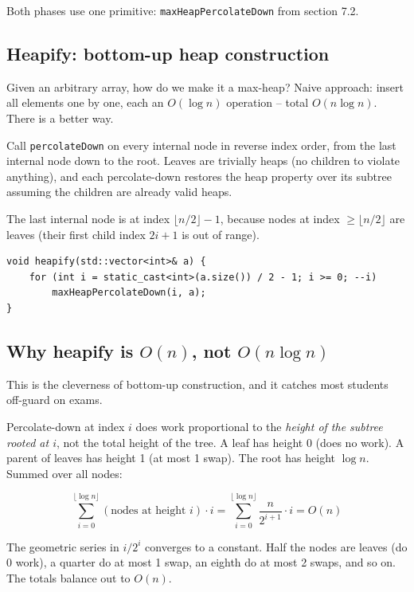 \documentclass[11pt]{article}
\begin{document}
Both phases use one primitive: \texttt{maxHeapPercolateDown} from section 7.2.

\subsection*{Heapify: bottom-up heap construction}

Given an arbitrary array, how do we make it a max-heap? Naive approach: insert all elements one by one, each an $O(\log n)$ operation -- total $O(n \log n)$. There is a better way.

\begin{defnbox}[Heapify]
Call \texttt{percolateDown} on every internal node in reverse index order, from the last internal node down to the root. Leaves are trivially heaps (no children to violate anything), and each percolate-down restores the heap property over its subtree assuming the children are already valid heaps.
\end{defnbox}

The last internal node is at index $\lfloor n/2 \rfloor - 1$, because nodes at index $\ge \lfloor n/2 \rfloor$ are leaves (their first child index $2i + 1$ is out of range).

\begin{lstlisting}
void heapify(std::vector<int>& a) {
    for (int i = static_cast<int>(a.size()) / 2 - 1; i >= 0; --i)
        maxHeapPercolateDown(i, a);
}
\end{lstlisting}

\subsection*{Why heapify is $O(n)$, not $O(n \log n)$}

This is the cleverness of bottom-up construction, and it catches most students off-guard on exams.

Percolate-down at index $i$ does work proportional to the \emph{height of the subtree rooted at $i$}, not the total height of the tree. A leaf has height 0 (does no work). A parent of leaves has height 1 (at most 1 swap). The root has height $\log n$. Summed over all nodes:

\[
\sum_{i=0}^{\lfloor \log n \rfloor} (\text{nodes at height } i) \cdot i
= \sum_{i=0}^{\lfloor \log n \rfloor} \frac{n}{2^{i+1}} \cdot i
= O(n)
\]

The geometric series in $i/2^i$ converges to a constant. Half the nodes are leaves (do 0 work), a quarter do at most 1 swap, an eighth do at most 2 swaps, and so on. The totals balance out to $O(n)$.
\end{document}
